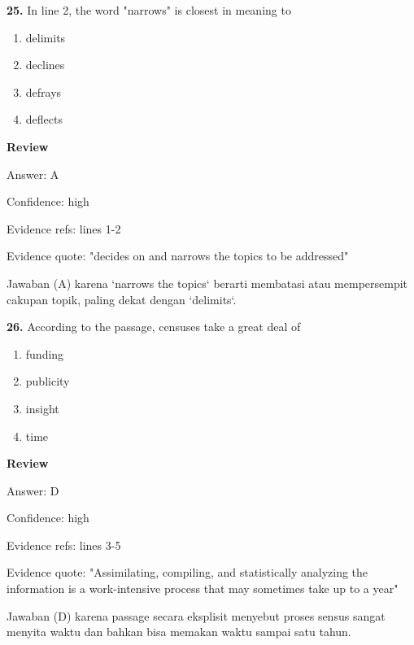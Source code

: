 \documentclass[12pt]{article}
\begin{document}
\endgroup
\par
\vspace{0.25\baselineskip}
\noindent\textbf{25.} In line 2, the word "narrows" is closest in meaning to
\begin{enumerate}[label=(\Alph*),leftmargin=*,itemsep=0.2em]
\item delimits
\item declines
\item defrays
\item deflects
\end{enumerate}
\par
\begingroup
\setlength{\parskip}{0pt}
\setlength{\parindent}{0pt}
\textbf{Review}\par
Answer: A\par
Confidence: high\par
Evidence refs: lines 1-2\par
Evidence quote: "decides on and narrows the topics to be addressed"\par
Jawaban (A) karena `narrows the topics` berarti membatasi atau mempersempit cakupan topik, paling dekat dengan `delimits`.\par
\endgroup
\par
\vspace{0.25\baselineskip}
\noindent\textbf{26.} According to the passage, censuses take a great deal of
\begin{enumerate}[label=(\Alph*),leftmargin=*,itemsep=0.2em]
\item funding
\item publicity
\item insight
\item time
\end{enumerate}
\par
\begingroup
\setlength{\parskip}{0pt}
\setlength{\parindent}{0pt}
\textbf{Review}\par
Answer: D\par
Confidence: high\par
Evidence refs: lines 3-5\par
Evidence quote: "Assimilating, compiling, and statistically analyzing the information is a work-intensive process that may sometimes take up to a year"\par
Jawaban (D) karena passage secara eksplisit menyebut proses sensus sangat menyita waktu dan bahkan bisa memakan waktu sampai satu tahun.\par
\endgroup
\par
\vspace{0.25\baselineskip}
\end{document}
